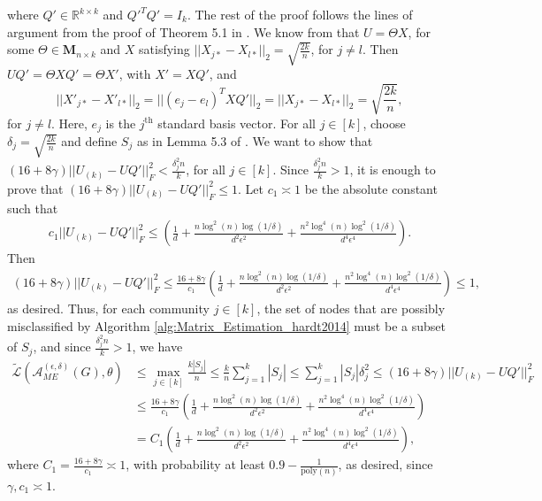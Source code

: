 \documentclass{article}
\begin{document}
where $Q' \in \mathbb{R}^{k \times k}$ and $Q'^TQ' = I_k$. The rest of the proof follows the lines of argument from the proof of Theorem 5.1 in \cite{HehEtal22}. We know from \cite{LeiRin15} that $U = \Theta X$, for some $\Theta \in \mathbf{M}_{n\times k}$ and $X$ satisfying $||X_{j*} - X_{l*}||_2 = \sqrt{\frac{2k}{n}}$, for $j \neq l$. Then $UQ' = \Theta XQ' = \Theta X'$, with $X' = XQ'$, and
\begin{equation*}
||X'_{j*} - X'_{l*}||_2 = ||(e_j- e_l)^TXQ'||_2 = ||X_{j*} - X_{l*}||_2 = \sqrt{\frac{2k}{n}},
\end{equation*}
for $j \neq l$. Here, $e_j$ is the $j^{\text{th}}$ standard basis vector. For all $j \in [k]$, choose $\delta_j = \sqrt{\frac{2k}{n}}$ and define $S_j$ as in Lemma 5.3 of \cite{LeiRin15}. We want to show that $(16 + 8\gamma)||U_{(k)} - UQ'||_F^2 < \frac{\delta_j^2n}{k}$, for all $j \in [k]$. Since $\frac{\delta_j^2n}{k} > 1$, it is enough to prove that $(16 + 8\gamma)||U_{(k)} - UQ'||_F^2 \leq 1$. Let $c_1 \asymp 1$ be the absolute constant such that
\begin{align*}
c_1 ||U_{(k)} - UQ'||_F^2 \leq \left(\frac{1}{d} + \frac{n\log^2(n)\log(1/\delta)}{d^2\epsilon^2} + \frac{n^2\log^4(n)\log^2(1/\delta)}{d^4\epsilon^4}\right).
\end{align*}
Then
\begin{align*}
(16 + 8\gamma)||U_{(k)} - UQ'||_F^2 \leq \frac{16 + 8\gamma}{c_1} \left(\frac{1}{d} + \frac{n\log^2(n)\log(1/\delta)}{d^2\epsilon^2} + \frac{n^2\log^4(n)\log^2(1/\delta)}{d^4\epsilon^4}\right) \leq 1, 
\end{align*}
as desired. Thus, for each
community $j \in [k]$, the set of nodes that are possibly misclassified by Algorithm \ref{alg:Matrix_Estimation_hardt2014} must be a subset of $S_j$, and since $\frac{\delta_j^2n}{k} > 1$, we have
\begin{align*}
\widetilde{\mathcal{L}}\left(\mathcal{A}_{ME}^{(\epsilon, \delta)}(G), \theta\right) &\leq \mathop{\max}_{j \in [k]}\frac{k|S_j|}{n} \leq \frac{k}{n}\sum_{j = 1}^k|S_j| \leq \sum_{j = 1}^k|S_j|\delta_j^2 \leq (16 + 8\gamma)||U_{(k)} - UQ'||_F^2\\
&\leq \frac{16 + 8\gamma}{c_1} \left(\frac{1}{d} + \frac{n\log^2(n)\log(1/\delta)}{d^2\epsilon^2} + \frac{n^2\log^4(n)\log^2(1/\delta)}{d^4\epsilon^4}\right)\\
&= C_1\left(\frac{1}{d} + \frac{n\log^2(n)\log(1/\delta)}{d^2\epsilon^2} + \frac{n^2\log^4(n)\log^2(1/\delta)}{d^4\epsilon^4}\right),
\end{align*}
where $C_1 = \frac{16 + 8\gamma}{c_1} \asymp 1$, with probability at least $0.9 - \frac{1}{\mathrm{poly}(n)}$, as desired, since $\gamma, c_1 \asymp 1$.
\end{document}
